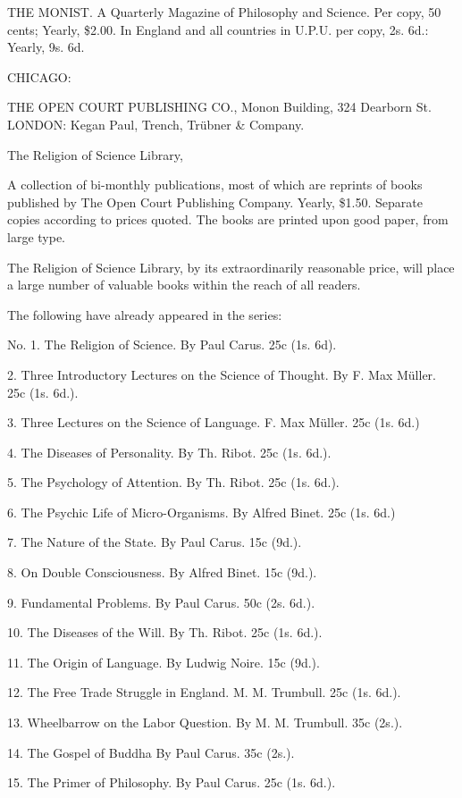 \documentclass[12pt]{book}[2005/09/16]
\renewcommand{\(}{{\upshape(}}
\renewcommand{\)}{{\upshape)}}
\begin{document}
THE MONIST.
A Quarterly Magazine of Philosophy and Science.
Per copy, 50 cents; Yearly, \$2.00. In England and all countries in
U.P.U. per copy, 2s. 6d.: Yearly, 9s. 6d.


CHICAGO:

THE OPEN COURT PUBLISHING CO.,
Monon Building, 324 Dearborn St.
LONDON: Kegan Paul, Trench, Trübner & Company.


The Religion of Science Library,

A collection of bi-monthly publications, most of which are reprints of
books published by The Open Court Publishing Company. Yearly, \$1.50.
Separate copies according to prices quoted. The books are printed upon
good paper, from large type.

The Religion of Science Library, by its extraordinarily reasonable price,
will place a large number of valuable books within the reach of all readers.

The following have already appeared in the series:

No. 1. The Religion of Science. By Paul Carus. 25c (1s. 6d).

2. Three Introductory Lectures on the Science of Thought. By F. Max
Müller. 25c (1s. 6d.).

3. Three Lectures on the Science of Language. F. Max Müller. 25c (1s. 6d.)

4. The Diseases of Personality. By Th. Ribot. 25c (1s. 6d.).

5. The Psychology of Attention. By Th. Ribot. 25c (1s. 6d.).

6. The Psychic Life of Micro-Organisms. By Alfred Binet. 25c (1s. 6d.)

7. The Nature of the State. By Paul Carus. 15c (9d.).

8. On Double Consciousness. By Alfred Binet. 15c (9d.).

9. Fundamental Problems. By Paul Carus. 50c (2s. 6d.).

10. The Diseases of the Will. By Th. Ribot. 25c (1s. 6d.).

11. The Origin of Language. By Ludwig Noire. 15c (9d.).

12. The Free Trade Struggle in England. M. M. Trumbull. 25c (1s. 6d.).

13. Wheelbarrow on the Labor Question. By M. M. Trumbull. 35c (2s.).

14. The Gospel of Buddha By Paul Carus. 35c (2s.).

15. The Primer of Philosophy. By Paul Carus. 25c (1s. 6d.).
\end{document}
